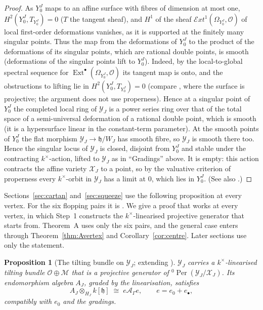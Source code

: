 \documentclass[11pt]{amsart}
\numberwithin{table}{section}
\numberwithin{figure}{section}
\numberwithin{equation}{section}
\newtheorem{prop}[thm]{Proposition}
\theoremstyle{definition}
\theoremstyle{plain}
\newcommand{\cA}{\mathcal{A}}
\newcommand{\cO}{\mathcal{O}}
\newcommand{\cX}{\mathcal{X}}
\newcommand{\cY}{\mathcal{Y}}
\newcommand{\h}{\mathfrak{h}}
\newcommand{\bul}{\bullet}
\DeclareMathOperator{\Ext}{Ext}
\DeclareMathOperator{\Per}{Per}
\begin{document}
\begin{proof}
As $Y_0^J$ maps to an affine surface with fibres of dimension at most one, $H^2(Y_0^J, T_{Y_0^J}) = 0$ ($T$ the tangent sheaf), and $H^1$ of the sheaf $\mathscr{E}\!xt^1(\Omega_{Y_0^J}, \cO)$ of local first-order deformations vanishes, as it is supported at the finitely many singular points. Thus the map from the deformations of $Y_0^J$ to the product of the deformations of its singular points, which are rational double points, is smooth (deformations of the singular points lift to $Y_0^J$). Indeed, by the local-to-global spectral sequence for $\Ext^\bullet(\Omega_{Y_0^J}, \cO)$ its tangent map is onto, and the obstructions to lifting lie in $H^2(Y_0^J, T_{Y_0^J}) = 0$ (compare \cite[\S2]{BW74}, where the surface is projective; the argument does not use properness). Hence at a singular point of $Y_0^J$ the completed local ring of $\cY_J$ is a power series ring over that of the total space of a semi-universal deformation of a rational double point, which is smooth (it is a hypersurface linear in the constant-term parameter). At the smooth points of $Y_0^J$ the flat morphism $\cY_J \to \h/W_J$ has smooth fibre, so $\cY_J$ is smooth there too. Hence the singular locus of $\cY_J$ is closed, disjoint from $Y_0^J$ and stable under the contracting $k^\times$-action, lifted to $\cY_J$ as in ``Gradings'' above. It is empty: this action contracts the affine variety $\cX_J$ to a point, so by the valuative criterion of properness every $k^\times$-orbit in $\cY_J$ has a limit at $0$, which lies in $Y_0^J$. (See also \cite[Example~8.10]{SMM}.)
\end{proof}

Sections~\ref{sec:cartan} and~\ref{sec:squeeze} use the following proposition at every vertex. For the six flopping pairs it is \cite[Prop~4.21]{K}. We give a proof that works at every vertex, in which Step~1 constructs the $k^\times$-linearised projective generator that \cite[Rem~3.5]{K} starts from. Theorem~A uses only the six pairs, and the general case enters through Theorem~\ref{thm:Avertex} and Corollary~\ref{cor:centre}. Later sections use only the statement.

\begin{prop}[{The tilting bundle on $\cY_J$; extending \cite[Prop~4.21]{K}}]\label{prop:tilting}
$\cY_J$ carries a $k^\times$-linearised tilting bundle $\cO \oplus \mathcal M$ that is a projective generator of ${}^0\Per(\cY_J/\cX_J)$. Its endomorphism algebra $A_J$, graded by the linearisation, satisfies
\[
A_J \otimes_{H_J} k[\h] \;\cong\; e\cA_\Gamma e, \qquad e = e_0 + e_\bul,
\]
compatibly with $e_0$ and the gradings.
\end{prop}
\end{document}
